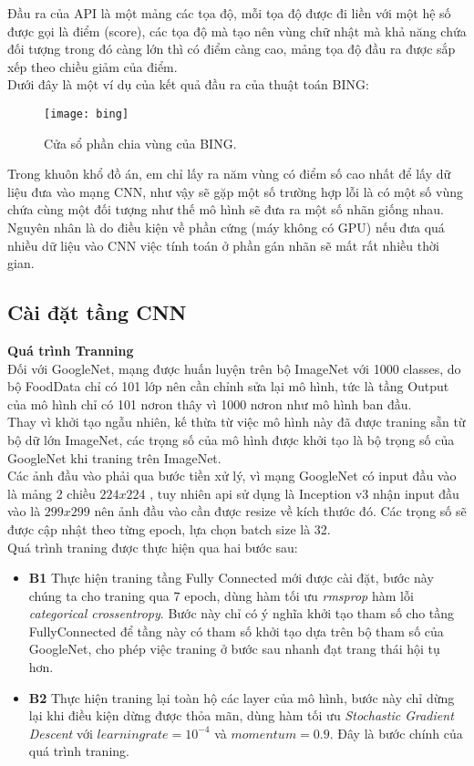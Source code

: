 \documentclass[13pt, a4paper]{extreport}
\begin{document}
\indent Đầu ra của API là một mảng các tọa độ, mỗi tọa độ được đi liền với một hệ số được gọi là điểm (score), các tọa độ mà tạo nên vùng chữ nhật mà khả năng chứa đối tượng trong đó càng lớn thì có điểm càng cao, mảng tọa độ đầu ra được sắp xếp theo chiều giảm của điểm.\\
\indent Dưới đây là một ví dụ của kết quả đầu ra của thuật toán BING:
\begin{figure}[H]
  \centering
  \captionsetup{justification=centering,margin=2cm}
    \texttt{[image: bing]}
   \caption{\large Cửa sổ phần chia vùng của BING.}
\end{figure}
\indent Trong khuôn khổ đồ án, em chỉ lấy ra năm vùng có điểm số cao nhất để lấy dữ liệu đưa vào mạng CNN, như vậy sẽ gặp một số trường hợp lỗi là có một số vùng chứa cùng một đối tượng như thế mô hình sẽ đưa ra một số nhãn giống nhau. Nguyên nhân là do điều kiện về phần cứng (máy không có GPU) nếu đưa quá nhiều dữ liệu vào CNN việc tính toán ở phần gán nhãn sẽ mất rất nhiều thời gian.
\subsection{Cài đặt tầng CNN}
\indent \textbf{Quá trình Tranning}\\
\indent Đối với GoogleNet, mạng được huấn luyện trên bộ ImageNet với 1000 classes, do bộ FoodData chỉ có 101 lớp nên cần chỉnh sửa lại mô hình, tức là tầng Output của mô hình chỉ có 101 nơron thây vì 1000 nơron như mô hình ban đầu.\\
\indent Thay vì khởi tạo ngẫu nhiên, kế thừa từ việc mô hình này đã được traning sẵn từ bộ dữ lớn ImageNet, các trọng số của mô hình được khởi tạo là bộ trọng số của GoogleNet khi traning trên ImageNet.\\
\indent Các ảnh đầu vào phải qua bước tiền xử lý, vì mạng GoogleNet có input đầu vào là mảng 2 chiều $224 x 224$ , tuy nhiên api sử dụng là Inception v3 nhận input đầu vào là $299 x 299$ nên ảnh đầu vào cần được resize về kích thước đó. Các trọng số sẽ được cập nhật theo từng epoch, lựa chọn batch size là 32.\\
\indent Quá trình traning được thực hiện qua hai bước sau:
\begin{itemize}
  \item \textbf{B1} Thực hiện traning tầng Fully Connected mới được cài đặt, bước này chúng ta cho traning qua 7 epoch, dùng hàm tối ưu \textit{rmsprop} hàm lỗi \textit{categorical crossentropy}. Bước này chỉ có ý nghĩa khởi tạo tham số cho tầng FullyConnected để tầng này có tham số khởi tạo dựa trên bộ tham số của GoogleNet, cho phép việc traning ở bước sau nhanh đạt trang thái hội tụ hơn.
  \item \textbf{B2} Thực hiện traning lại toàn hộ các layer của mô hình, bước này chỉ dừng lại khi điều kiện dừng được thỏa mãn, dùng hàm tối ưu \textit{Stochastic Gradient Descent} với $learning rate = 10^{-4}$ và $momentum = 0.9$. Đây là bước chính của quá trình traning.
\end{itemize}
\end{document}
